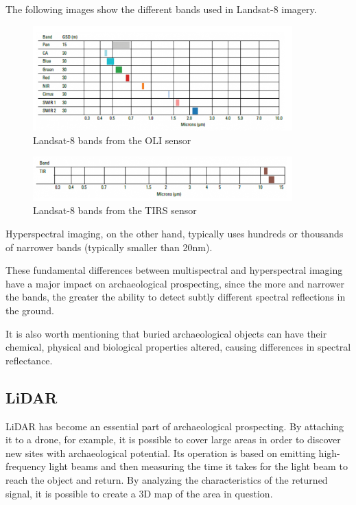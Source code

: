 The following images show the different bands used in Landsat-8 imagery.

\begin{figure}[H]
\centering
\includegraphics[width=10cm]{images/landsat1.png}
\caption{Landsat-8 bands from the OLI sensor\cite{landsat}}
\end{figure}

\begin{figure}[H]
\centering
\includegraphics[width=10cm]{images/landsat2.png}
\caption{Landsat-8 bands from the TIRS sensor\cite{landsat}}
\end{figure}

Hyperspectral imaging, on the other hand, typically uses hundreds or thousands of narrower bands (typically smaller than 20nm).

These fundamental differences between multispectral and hyperspectral imaging have a major impact on archaeological prospecting, since the more and narrower the bands, the greater the ability to detect subtly different spectral reflections in the ground.

It is also worth mentioning that buried archaeological objects can have their chemical, physical and biological properties altered, causing differences in spectral reflectance.


\subsection{LiDAR}
LiDAR has become an essential part of archaeological prospecting. By attaching it to a drone, for example, it is possible to cover large areas in order to discover new sites with archaeological potential.  Its operation is based on emitting high-frequency light beams and then measuring the time it takes for the light beam to reach the object and return.
By analyzing the characteristics of the returned signal, it is possible to create a 3D map of the area in question.

